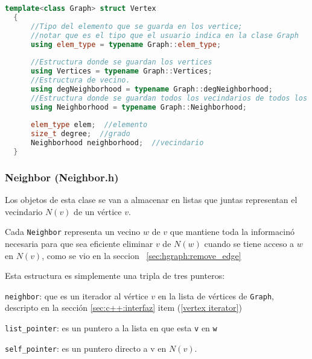 \documentclass[a4paper,12pt]{article}
\makeatletter
\newcommand{\Code}[1]{\lstinline[basicstyle={\tt}]@#1@}
\makeatother
\begin{document}
\begin{lstlisting}[language={C++},caption={Estructura del tipo Grafo en C++.},gobble=2,float=ht,label={lst:c++:graph}]
  template<class Graph> struct Vertex
  {
      //Tipo del elemento que se guarda en los vertice;
      //notar que es el tipo que el usuario indica en la clase Graph
      using elem_type = typename Graph::elem_type;
  
      //Estructura donde se guardan los vertices
      using Vertices = typename Graph::Vertices;
      //Estructura de vecino.
      using degNeighborhood = typename Graph::degNeighborhood;
      //Estructura donde se guardan todos los vecindarios de todos los grados.
      using Neighborhood = typename Graph::Neighborhood;
      
      elem_type elem;  //elemento
      size_t degree;  //grado
      Neighborhood neighborhood;  //vecindario
  }
\end{lstlisting}

\subsubsection{Neighbor (Neighbor.h)}
\label{sec:c++:estructura:Neighbor.h}

Los objetos de esta clase se van a almacenar en listas que juntas representan el vecindario $N(v)$ de un vértice $v$.

Cada \Code{Neighbor} representa un vecino $w$ de $v$ que mantiene toda la informacinó necesaria para que sea eficiente eliminar $v$ de $N(w)$ cuando se tiene acceso a $w$ en $N(v)$, como se vio en la seccion ~\ref{sec:hgraph:remove_edge}

Esta estructura es simplemente una tripla de tres punteros:

\Code{neighbor}: que es un iterador al vértice $v$ en la lista de vértices de \Code{Graph}, descripto en la sección \ref{sec:c++:interfaz} item (\ref{vertex iterator})

\Code{list_pointer}: es un puntero a la lista en que esta \Code{v} en \Code{w}

\Code{self_pointer}: es un puntero directo a v en $N(v)$.
\end{document}
